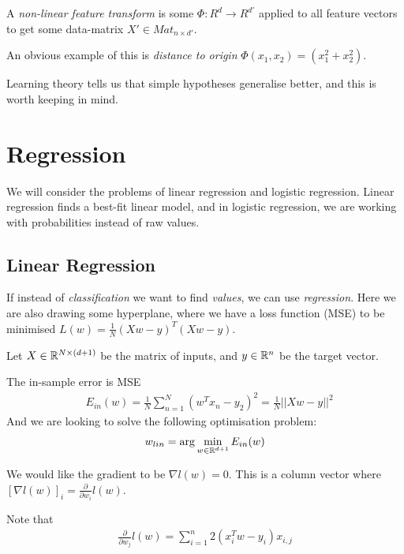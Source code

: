 \documentclass{article}
\begin{document}
      A \emph{non-linear feature transform} is some $\Phi : R^d \rightarrow R^{d'}$ applied to all feature vectors to get some data-matrix $X' \in Mat_{n \times d'}$. 

      An obvious example of this is \emph{distance to origin} $\Phi(x_1, x_2) = (x_1^2 + x_2^2)$. 

      Learning theory tells us that simple hypotheses generalise better, and this is worth keeping in mind. 

\section{Regression}
    We will consider the problems of linear regression and logistic regression. Linear regression finds a best-fit linear model, and in logistic regression, we are working with probabilities instead of raw values.

      \subsection{Linear Regression}

      If instead of \emph{classification} we want to find \emph{values}, we can use \emph{regression}. Here we are also drawing some hyperplane, where we have a loss function (MSE) to be minimised $L(w) = \frac{1}{N}(Xw-y)^T(Xw-y)$. 


      Let $X \in \mathbb{R}^{N \times (d+1)}$ be the matrix of inputs, and $y \in \mathbb{R}^{n}$ be the target vector. 
      
      The in-sample error is MSE 
      \begin{align}
        & E_{in}(w) = \frac{1}{N}\sum_{n=1}^{N}{(w^Tx_n - y_2)^2} = \frac{1}{N}||Xw - y||^2
      \end{align}
      And we are looking to solve the following optimisation problem: 
      \begin{align}
       w_{lin} = \arg \min_{w \in \mathbb{R}^{d+1}}E_{in}(w)
      \end{align}

      We would like the gradient to be $\nabla l(w) = 0$. This is a column vector where $[\nabla l(w)]_i = \frac{\partial}{\partial w_i}l(w)$. 

     Note that 
     \begin{align}
     \frac{\partial}{\partial w_j}l(w) = \sum_{i=1}^{n} 2(x^T_iw - y_i)x_{i, j}
     \end{align}
     
\end{document}
